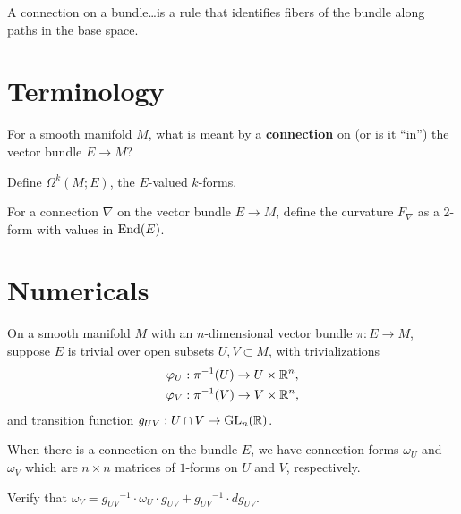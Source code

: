 \documentclass{homework}
\author{Jim Fowler}
\DeclareMathOperator{\GL}{GL}
\begin{document}
\maketitle

\begin{inspiration}
A connection on a bundle\ldots is a rule that identifies fibers of the bundle along paths in the base space.
\end{inspiration}

\section{Terminology}

\begin{problem} For a smooth manifold $M$, what is meant by a
\textbf{connection} on (or is it ``in'') the vector bundle $E \to M$?
\end{problem}

\begin{problem} Define $\Omega^k(M;E)$, the $E$-valued $k$-forms.
\end{problem}

\begin{problem} For a connection $\nabla$ on the vector bundle $E \to
M$, define the curvature $F_\nabla$ as a 2-form with values in $\operatorname{End}(E)$.
\end{problem}

\section{Numericals}

\begin{problem}
  On a smooth manifold $M$ with an $n$-dimensional vector bundle $\pi : E \to M$, suppose $E$ is trivial over open subsets $U, V \subset M$, with trivializations
  \begin{align*}
    \varphi_U &: \pi^{-1}(U) \to U \times \mathbb{R}^n, \\
    \varphi_V &: \pi^{-1}(V) \to V \times \mathbb{R}^n,
  \end{align*}
  and transition function $g_{UV} : U \cap V \to \GL_n(\R)$.

  When there is a connection on the bundle $E$, we have connection
forms $\omega_U$ and $\omega_V$ which are $n \times n$ matrices of
$1$-forms on $U$ and $V$, respectively.

  Verify that \(
    \omega_V = {g_{UV}}^{-1} \cdot \omega_U \cdot g_{UV} + {g_{UV}}^{-1} \cdot dg_{UV}
  \).
\end{problem}
\end{document}
